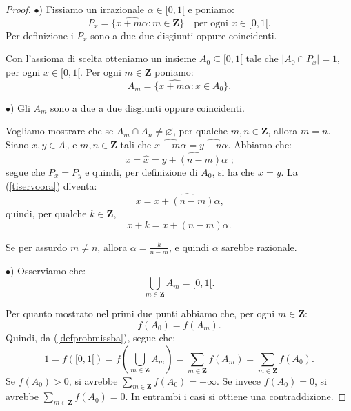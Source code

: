 \documentclass[a4paper,oneside,11pt]{book}
\theoremstyle{definition} \newtheorem{Def}{Definizione}
\theoremstyle{plain} \newtheorem{teo}{Teorema}
\theoremstyle{plain} \newtheorem{cor}[teo]{Corollario}
\theoremstyle{definition} \newtheorem{lem}[teo]{Lemma}
\theoremstyle{plain} \newtheorem{pro}[teo]{Proposizione}
\newcommand{\ug}[1]{(\ref{#1})} %
\begin{document}
\begin{proof}
		$\bullet$) Fissiamo  un irrazionale $\alpha \in [0,1[$ e poniamo: %
		\begin{equation*}
			P_x = \{ \widehat{x + m\alpha} : m \in \mathbf{Z}\} \quad \text{per ogni } x \in [0, 1[ \text{.} %
		\end{equation*}
		Per definizione i $P_x$ sono a due due disgiunti oppure coincidenti.
		
		Con l'assioma di scelta otteniamo un insieme $A_0 \subseteq [0, 1[$ tale che $|A_0 \cap P_x| = 1$, per ogni $x \in [0,1[$. Per ogni $m \in \mathbf{Z}$ poniamo: %
		\begin{equation*}
			A_m = \{\widehat{x + m\alpha} : x \in A_0\} \text{.}
		\end{equation*}
		
		$\bullet$) Gli $A_m$ sono a due a due disgiunti oppure coincidenti.
		
		Vogliamo mostrare che se $A_m \cap A_n \neq \varnothing$, per qualche $m,n \in \mathbf{Z}$, allora $m = n$. Siano $x,y \in A_0$ e $m,n \in \mathbf{Z}$ tali che $\widehat{x+m\alpha} = \widehat{y + n\alpha}$. Abbiamo che:
		\begin{equation}\label{tiservoora}
			x = \hat{x} = \widehat{y + (n-m)\alpha} \text{ ;}
		\end{equation}
		segue che $P_x = P_y$ e quindi, per definizione di $A_0$, si ha che $x = y$. La \ug{tiservoora} diventa:
		\begin{equation*}
			x = \widehat{x + (n-m)\alpha} \text{,}
		\end{equation*}
		quindi, per qualche $k \in \mathbf{Z}$,
		\begin{equation*}
			x + k = x + (n - m) \alpha \text{.}
		\end{equation*}
		
		Se per assurdo $m \neq n$, allora $\alpha = \frac{k}{n-m}$, e quindi $\alpha$ sarebbe razionale. \lightning
		 
		$\bullet$) Osserviamo che:
		\begin{equation*}
			\bigcup_{m \in \mathbf{Z}} A_m = [0, 1[ \text{.} %
		\end{equation*}
		
		Per quanto mostrato nel primi due punti abbiamo che, per ogni $m \in \mathbf{Z}$:
		\begin{equation*}
			f(A_0) = f(A_m) \text{.}
		\end{equation*}
		Quindi, da (\ref{defprobmissba}), segue che:
		\begin{equation*}
				1 = f([0, 1[) = f\left(\bigcup_{m \in \mathbf{Z}} A_m\right) = \sum_{m \in \mathbf{Z}} f(A_m) = \sum_{m \in \mathbf{Z}} f(A_0) \text{.}%
		\end{equation*}
		Se $f(A_0)>0$, si avrebbe $\sum\limits_{m \in \mathbf{Z}} f(A_0) = +\infty$. Se invece $f(A_0) = 0$, si avrebbe $\sum\limits_{m \in \mathbf{Z}} f(A_0) = 0$. In entrambi i casi si ottiene una contraddizione.\lightning
	\end{proof}
	
\end{document}
